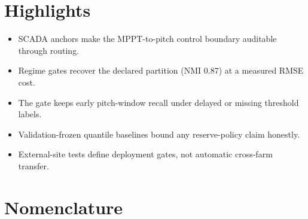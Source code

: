 \documentclass[
  11pt]{article}
\providecommand{\tightlist}{%
  \setlength{\itemsep}{0pt}\setlength{\parskip}{0pt}}
\begin{document}
\vspace{0.25em}


\normalsize

\vspace{0.55em}

\section*{Highlights}\label{highlights}

\begin{itemize}
\tightlist
\item
  SCADA anchors make the MPPT-to-pitch control boundary auditable
  through routing.
\item
  Regime gates recover the declared partition (NMI 0.87) at a measured
  RMSE cost.
\item
  The gate keeps early pitch-window recall under delayed or missing
  threshold labels.
\item
  Validation-frozen quantile baselines bound any reserve-policy claim
  honestly.
\item
  External-site tests define deployment gates, not automatic cross-farm
  transfer.
\end{itemize}

\section*{Nomenclature}\label{nomenclature}
\end{document}
